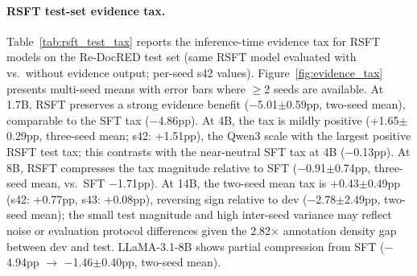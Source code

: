 \begin{table}[t]
\centering
\caption{Evidence tax on Re-DocRED test set (Ign-F1 \%). Tax $=$ no-evi $-$ with-evi; negative $=$ benefit. All results use s42. Dev tax from Table~\ref{tab:training_tax}.}
\label{tab:test_tax}
\small
{}
\end{table}

\paragraph{RSFT test-set evidence tax.}
Table~\ref{tab:rsft_test_tax} reports the inference-time evidence tax for RSFT models on the Re-DocRED test set (same RSFT model evaluated with vs.\ without evidence output; per-seed s42 values). Figure~\ref{fig:evidence_tax} presents multi-seed means with error bars where $\geq$2 seeds are available. At 1.7B, RSFT preserves a strong evidence benefit ($-$5.01$\pm$0.59pp, two-seed mean), comparable to the SFT tax ($-$4.86pp). At 4B, the tax is mildly positive (+1.65$\pm$0.29pp, three-seed mean; s42: +1.51pp), the Qwen3 scale with the largest positive RSFT test tax; this contrasts with the near-neutral SFT tax at 4B ($-$0.13pp). At 8B, RSFT compresses the tax magnitude relative to SFT ($-$0.91$\pm$0.74pp, three-seed mean, vs.\ SFT $-$1.71pp). At 14B, the two-seed mean tax is +0.43$\pm$0.49pp (s42: +0.77pp, s43: +0.08pp), reversing sign relative to dev ($-$2.78$\pm$2.49pp, two-seed mean); the small test magnitude and high inter-seed variance may reflect noise or evaluation protocol differences given the 2.82$\times$ annotation density gap between dev and test. LLaMA-3.1-8B shows partial compression from SFT ($-$4.94pp $\to$ $-$1.46$\pm$0.40pp, two-seed mean).

